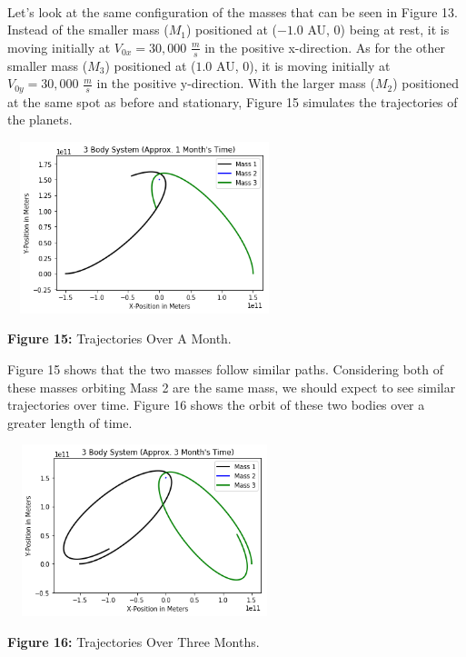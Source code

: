 \documentclass[]{article}
\begin{document}
\begin{multicols}{2}
\paragraph{}
\setlength{\parskip}{1em}
Let's look at the same configuration of the masses that can be seen in Figure 13. Instead of the smaller mass ($M_1$) positioned at ($-1.0$ AU, 0) being at rest, it is moving initially at $V_{0x}=30,000$ $\frac{m}{s}$ in the positive x-direction. As for the other smaller mass ($M_3$) positioned at ($1.0$ AU, 0), it is moving initially at $V_{0y}=30,000$ $\frac{m}{s}$ in the positive y-direction. With the larger mass ($M_2$) positioned at the same spot as before and stationary, Figure 15 simulates the trajectories of the planets.
\begin{center}
\includegraphics[width=8cm, height=5cm]{PHYS 342 FP 3-Body Dynamics (3).png}
\caption{\small{\textbf{Figure 15:}} \tiny{Trajectories Over A Month.}}
\end{center}
Figure 15 shows that the two masses follow similar paths. Considering both of these masses orbiting Mass 2 are the same mass, we should expect to see similar trajectories over time. Figure 16 shows the orbit of these two bodies over a greater length of time.
\begin{center}
\includegraphics[width=8cm, height=5cm]{PHYS 342 FP 3-Body Dynamics (4).png}
\caption{\small{\textbf{Figure 16:}} \tiny{Trajectories Over Three Months.}}
\end{center}

\end{multicols}
\end{document}
